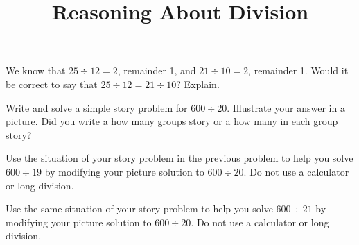 \documentclass{ximera}
\title{Reasoning About Division}
\begin{document}
\begin{abstract} \end{abstract}
\maketitle


\begin{problem}
We know that $25 \div 12 = 2$, remainder 1, and
$21 \div 10 = 2$, remainder 1. 
Would it be correct to say that $25 \div 12 = 21 \div 10$?  Explain.


\end{problem}


\begin{problem}
 Write and solve a simple story problem for $600 \div 20$.  Illustrate your answer in a picture.  Did you write a \underline{how many groups} story or a \underline{how many in each group} story?
\end{problem}

\begin{problem}
  Use the situation of your story problem in the previous problem to help you solve $600 \div 19$ by modifying your picture solution to $600 \div 20$.  Do not use a calculator or long division.
\end{problem}

\begin{problem}
 Use the same situation of your story problem to help you solve $600 \div 21$ by modifying your picture solution to $600 \div 20$.  Do not use a calculator or long division.

\end{problem}

\newpage
\end{document}
